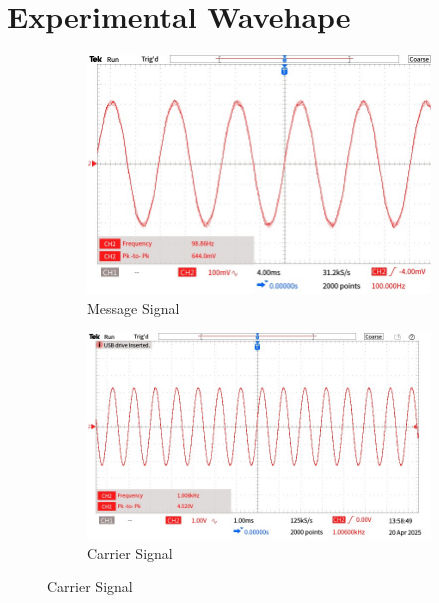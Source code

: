 \documentclass[a4paper,12pt]{article}
\begin{document}
	
	

	
	
	
	\section{Experimental Wavehape}
	\begin{figure}[H]
	\centering
	\begin{subfigure}[t]{0.7\textwidth}
		\centering
		\includegraphics[width=1\linewidth]{Images/5.1}
		\caption{Message Signal}
		\vspace{0.1cm}
	\end{subfigure}

	\begin{subfigure}[t]{0.7\textwidth}
		\centering
		\includegraphics[width=1\linewidth]{Images/6}
		\caption{ Carrier Signal}
	\end{subfigure}
	

\end{figure}
\end{document}
